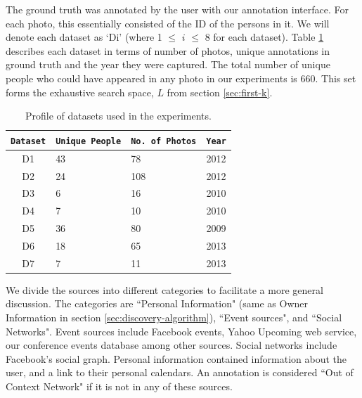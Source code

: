 The ground truth was annotated by the user with our annotation interface. For each photo, this essentially consisted of the ID of the persons in it.  We will denote each dataset as `Di' (where 1 $\leq$ $i$ $\leq$ 8 for each dataset). Table \ref{tbl:unique-persons} describes each dataset in terms of number of photos, unique annotations in ground truth and the year they were captured. The total number of unique people who could have appeared in any photo in our experiments is 660. This set forms the exhaustive search space, $L$ from section \ref{sec:first-k}.

\begin{table}[h]
\begin{center}
\begin{tabular}{ |c|p{1.5cm}|p{1.5cm}|c| }
  \hline
  \texttt{Dataset} & \texttt{Unique People} & \texttt{No.\ of Photos} & \texttt{Year} \\
  \hline
  D1 & 43 & 78 & 2012\\
  D2 & 24 & 108 & 2012\\
  D3 & 6 & 16 & 2010\\
  D4 & 7 & 10 & 2010\\
  D5 & 36 & 80 & 2009\\
  D6 & 18 & 65 & 2013\\
  D7 & 7 & 11 & 2013\\
  \hline
\end{tabular}
\caption{Profile of datasets used in the experiments.}
\label{tbl:unique-persons}
\end{center}
\end{table}

We divide the sources into different categories to facilitate a more general discussion. The categories are ``Personal Information" (same as Owner Information in section \ref{sec:discovery-algorithm}), ``Event sources", and ``Social Networks". Event sources include Facebook events, Yahoo Upcoming web service, our conference events database among other sources. Social networks include Facebook's social graph. Personal information contained information about the user, and a link to their personal calendars. An annotation is considered ``Out of Context Network" if it is not in any of these sources.

